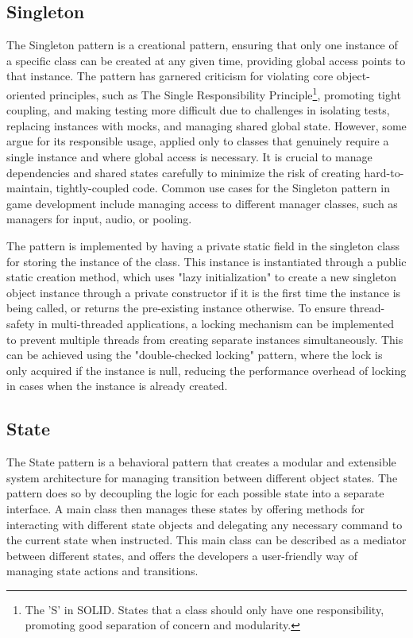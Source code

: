 \subsection{Singleton}
    The Singleton pattern is a creational pattern, ensuring that only one instance of a specific class can be created at any given time, providing global access points to that instance\cite{refactoringguru-singleton}. The pattern has garnered criticism for violating core object-oriented principles, such as The Single Responsibility Principle\footnote{The 'S' in SOLID. States that a class should only have one responsibility, promoting good separation of concern and modularity.}, promoting tight coupling, and making testing more difficult due to challenges in isolating tests, replacing instances with mocks, and managing shared global state. However, some argue for its responsible usage, applied only to classes that genuinely require a single instance and where global access is necessary. It is crucial to manage dependencies and shared states carefully to minimize the risk of creating hard-to-maintain, tightly-coupled code. Common use cases for the Singleton pattern in game development include managing access to different manager classes, such as managers for input, audio, or pooling.

    The pattern is implemented by having a private static field in the singleton class for storing the instance of the class. This instance is instantiated through a public static creation method, which uses "lazy initialization" to create a new singleton object instance through a private constructor if it is the first time the instance is being called, or returns the pre-existing instance otherwise. To ensure thread-safety in multi-threaded applications, a locking mechanism can be implemented to prevent multiple threads from creating separate instances simultaneously. This can be achieved using the "double-checked locking" pattern, where the lock is only acquired if the instance is null, reducing the performance overhead of locking in cases when the instance is already created.

\subsection{State}
    The State pattern is a behavioral pattern that creates a modular and extensible system architecture for managing transition between different object states\cite{gameprogpatterns-state}. The pattern does so by decoupling the logic for each possible state into a separate interface. A main class then manages these states by offering methods for interacting with different state objects and delegating any necessary command to the current state when instructed. This main class can be described as a mediator between different states, and offers the developers a user-friendly way of managing state actions and transitions.

